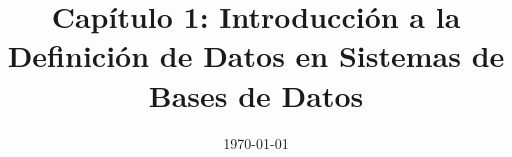 \documentclass[12pt]{report}
\title{\textbf{Capítulo 1: Introducción a la Definición de Datos en Sistemas de Bases de Datos}}
\author{}
\date{\today}
\begin{document}
\maketitle
\tableofcontents
\bigskip












\end{document}
